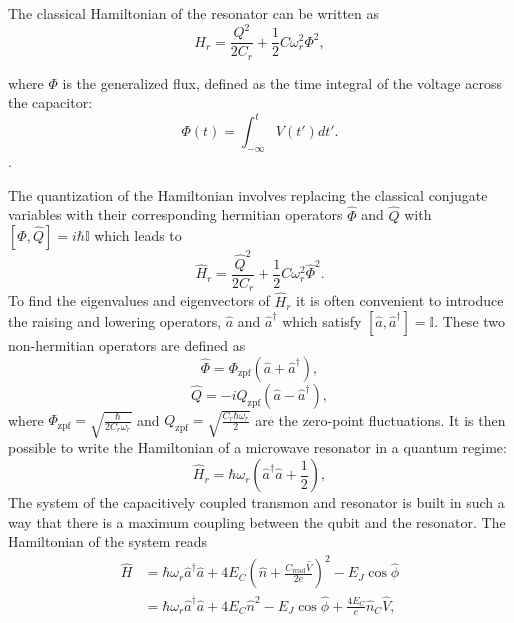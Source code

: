 The classical Hamiltonian of the resonator can be written as 
\begin{equation}\label{eq:classical_hamiltonian_resonator}
    H_r = \frac{Q^2}{2C_r} +  \frac{1}{2}C\omega_r^2\Phi^2,
\end{equation}

where $\Phi$ is the generalized flux, defined as the time integral of the voltage across the capacitor:
\begin{equation}\label{eq:generalized_flux}
    \Phi(t) = \int_{-\infty}^{t} V(t')dt' .
\end{equation}.

The quantization of the Hamiltonian involves replacing the classical conjugate variables with their corresponding hermitian operators $\hat{\Phi}$ and $\hat{Q}$ with $[\hat{\Phi},\hat{Q}]=i\hbar\mathbb{I}$ which leads to
\begin{equation}
    \hat{H}_r = \frac{\hat{Q}^2}{2C_r} +  \frac{1}{2}C\omega_r^2\hat{\Phi}^2.
\end{equation}
To find the eigenvalues and eigenvectors of $\hat{H}_r$ it is often convenient to introduce the raising and lowering operators, $\hat{a}$ and $\hat{a}^\dagger$ which satisfy $[\hat{a},\hat{a}^\dagger]=\mathbb{I}$.
These two non-hermitian operators are defined as 
\begin{equation}\label{eq:Phi_operator}
    \hat{\Phi} =  \Phi_{\text{zpf}}(\hat{a} + \hat{a}^\dagger),
\end{equation}
\begin{equation}\label{eq:Q_operator}
    \hat{Q} = -iQ_{\text{zpf}}(\hat{a} - \hat{a}^\dagger),
\end{equation}
where $\Phi_{\text{zpf}} = \sqrt{\frac{\hbar}{2C_r\omega_r}}$ and $Q_{\text{zpf}} = \sqrt{\frac{C_r\hbar \omega_r}{2}}$ are the zero-point fluctuations.
It is then possible to write the Hamiltonian of a microwave resonator in a quantum regime:
\begin{equation}\label{eq:quant_resonator_hamiltonian}
    \hat{H}_r = \hbar\omega_r\left(\hat{a}^\dagger\hat{a} + \frac{1}{2}\right),
\end{equation}
The system of the capacitively coupled transmon and resonator is built in such a way that there is a maximum coupling between the qubit and the resonator.
The Hamiltonian of the system reads
\begin{align}
    \hat{H} &= \hbar \omega_r \hat{a}^\dagger \hat{a} + 4E_C (\hat{n} + \frac{C_{\text{read}}\hat{V}}{2e})^2- E_J \cos\hat{\phi}\\ 
    &= \hbar \omega_r \hat{a}^\dagger \hat{a} + 4E_C \hat{n}^2 - E_J \cos\hat{\phi} + \frac{4E_C}{e} \hat{n}_C \hat{V},
\end{align}
